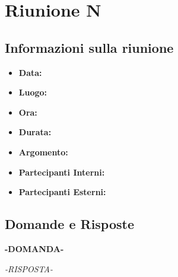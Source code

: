 \section{Riunione N}
  \subsection{Informazioni sulla riunione}
    \begin{itemize}
      \item \textbf{Data: }
      \item \textbf{Luogo: }
      \item \textbf{Ora: }
      \item \textbf{Durata: }
      \item \textbf{Argomento: }
      \item \textbf{Partecipanti Interni: }
      \item \textbf{Partecipanti Esterni: }
    \end{itemize}
  \subsection{Domande e Risposte}
    \textbf{-DOMANDA-}
    \begin{center}
      \emph{-RISPOSTA-}
    \end{center}
    
